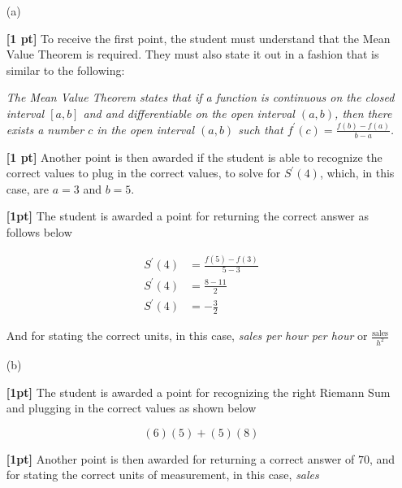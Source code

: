 \documentclass{article}
\newcommand{\qspace}{\vspace*{1.7em}}
\begin{document}
    \begin{enumerate}

		\item[(a)]
		
            \textbf{[1 pt]} To receive the first point, the student must understand that the Mean Value Theorem
            is required. They must also state it out in a fashion that is similar to the following: 

            \begin{center}
                \textit{The Mean Value Theorem states that if a function is continuous on the closed interval $[a, b]$ 
                and and differentiable on the open interval $(a, b)$, then there exists a number $c$ in the 
                open interval $(a, b)$ such that $f^{\prime}(c) = \frac{f(b) - f(a)}{b - a}$.}
            \end{center}

            \textbf{[1 pt]} Another point is then awarded if the student is able to recognize the correct values to plug in the correct values,
            to solve for $S^{\prime}(4)$, which, in this case, are $a = 3$ and $b = 5$.

            \textbf{[1pt]} The student is awarded a point for returning the correct answer as follows below

            \[
                \begin{aligned}
                    S^{\prime}(4) &= \frac{f(5) - f(3)}{5 - 3} \\
                    S^{\prime}(4) &= \frac{8 - 11}{2} \\
                    S^{\prime}(4) &= -\frac{3}{2}
                \end{aligned}    
            \]

            And for stating the correct units, in this case, \textit{sales per hour per hour} or $\frac{\text{sales}}{h^2}$ \qspace
		
		\item[(b)]
		
                \textbf{[1pt]} The student is awarded a point for recognizing the right Riemann Sum and plugging in the correct values
                as shown below

                \[
                        (6)(5) + (5)(8)
                \]

                \textbf{[1pt]} Another point is then awarded for returning a correct answer of $70$, and for stating the 
                correct units of measurement, in this case, \textit{sales} \qspace
		

\end{enumerate}
\end{document}
